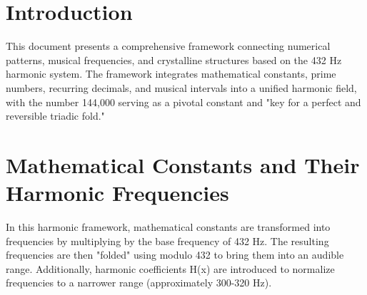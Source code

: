\section*{Introduction}
This document presents a comprehensive framework connecting numerical patterns, musical frequencies, and crystalline structures based on the 432 Hz harmonic system. The framework integrates mathematical constants, prime numbers, recurring decimals, and musical intervals into a unified harmonic field, with the number 144,000 serving as a pivotal constant and "key for a perfect and reversible triadic fold."

\begin{center}
\end{center}

\section{Mathematical Constants and Their Harmonic Frequencies}

In this harmonic framework, mathematical constants are transformed into frequencies by multiplying by the base frequency of 432 Hz. The resulting frequencies are then "folded" using modulo 432 to bring them into an audible range. Additionally, harmonic coefficients H(x) are introduced to normalize frequencies to a narrower range (approximately 300-320 Hz).

